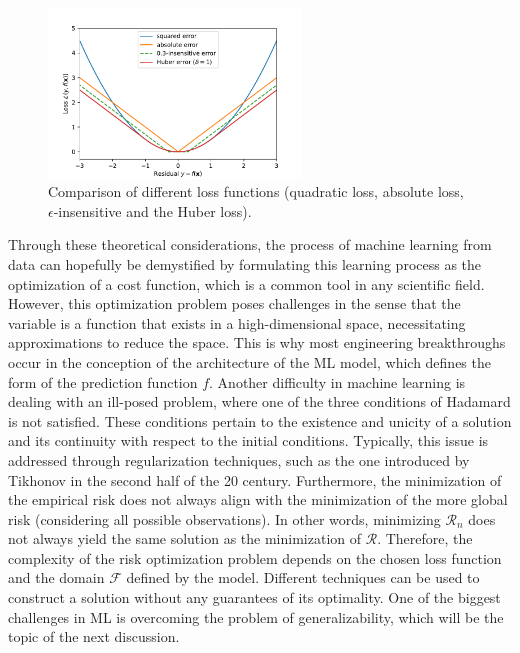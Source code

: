 \documentclass[main]{subfiles}
\begin{document}
\begin{figure}[ht]
  \centering
    \includegraphics[width=0.6\textwidth]{figures/4-ml/loss_comparison.pdf}
    \caption{Comparison of different loss functions (quadratic loss, absolute loss, $\epsilon$-insensitive and the Huber loss). }\label{fgr:loss_comp}
\end{figure}

Through these theoretical considerations, the process of machine learning from data can hopefully be demystified by formulating this learning process as the optimization of a cost function, which is a common tool in any scientific field. However, this optimization problem poses challenges in the sense that the variable is a function that exists in a high-dimensional space, necessitating approximations to reduce the space. This is why most engineering breakthroughs occur in the conception of the architecture of the ML model, which defines the form of the prediction function $f$. Another difficulty in machine learning is dealing with an ill-posed problem, where one of the three conditions of Hadamard is not satisfied. These conditions pertain to the existence and unicity of a solution and its continuity with respect to the initial conditions. Typically, this issue is addressed through regularization techniques, such as the one introduced by Tikhonov in the second half of the 20 century. Furthermore, the minimization of the empirical risk does not always align with the minimization of the more global risk (considering all possible observations). In other words, minimizing $\mathcal{R}_n$ does not always yield the same solution as the minimization of $\mathcal{R}$. Therefore, the complexity of the risk optimization problem depends on the chosen loss function and the domain $\mathcal{F}$ defined by the model. Different techniques can be used to construct a solution without any guarantees of its optimality. One of the biggest challenges in ML is overcoming the problem of generalizability, which will be the topic of the next discussion. 
\end{document}
